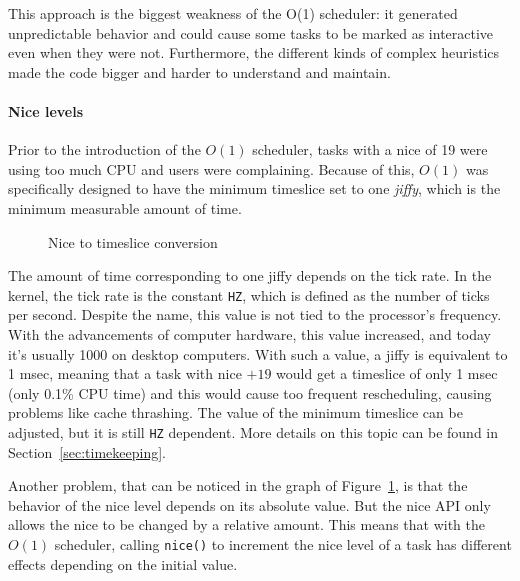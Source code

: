 This approach is the biggest weakness of the O(1) scheduler: it generated unpredictable behavior and could cause some tasks to be marked as interactive even when they were not. Furthermore, the different kinds of complex heuristics made the code bigger and harder to understand and maintain.

\paragraph{Nice levels} 
Prior to the introduction of the $O(1)$ scheduler, tasks with a nice of 19 were using too much CPU and users were complaining.\cite{nice_design} Because of this, $O(1)$ was specifically designed to have the minimum timeslice set to one \textit{jiffy}, which is the minimum measurable amount of time.  
\begin{figure}[t]
  \centering
  \caption{Nice to timeslice conversion}
  \label{fig:timeslice_vs_nice}
\end{figure}%
The amount of time corresponding to one jiffy depends on the tick
rate. In the kernel, the tick rate is the constant \verb|HZ|, which is defined as the number of ticks per second. Despite the name, this value is not tied to the processor's frequency. 
With the advancements of
computer hardware, this value increased, and today it's usually 1000 on desktop computers. With such a value, a jiffy is equivalent to 1 msec, meaning that a task with nice $+19$
would get a timeslice of only 1 msec (only 0.1\% CPU time) and this would cause too frequent
rescheduling, causing problems like cache thrashing. The value of the
minimum timeslice can be adjusted, but it is still \verb|HZ| dependent. More
details on this topic can be found in Section~\ref{sec:timekeeping}.

Another problem, that can be noticed in the graph of
Figure~\ref{fig:timeslice_vs_nice}, is that the behavior of the nice
level depends on its absolute value. But the nice API only allows the nice to be changed by a relative amount. 
This means that with the $O(1)$ scheduler, calling \verb|nice()| to increment the nice level of a task has different effects depending on the initial value. 

